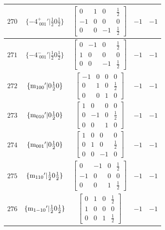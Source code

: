 \documentclass[fleqn,8pt]{jsarticle}
\begin{document}
\begin{longtable}{ccccc}
$ 270 $ & $ \{-4^{+}_{\,\,001}{}'|\frac{1}{2} 0 \frac{1}{2}\} $ & $ \begin{bmatrix} 0 & 1 & 0 & \frac{1}{2} \\ -1 & 0 & 0 & 0 \\ 0 & 0 & -1 & \frac{1}{2} \end{bmatrix} $ & $ -1 $ & $ -1 $ \\ \hline
$ 271 $ & $ \{-4^{-}_{\,\,001}{}'|\frac{1}{2} 0 \frac{1}{2}\} $ & $ \begin{bmatrix} 0 & -1 & 0 & \frac{1}{2} \\ 1 & 0 & 0 & 0 \\ 0 & 0 & -1 & \frac{1}{2} \end{bmatrix} $ & $ -1 $ & $ -1 $ \\ \hline
$ 272 $ & $ \{{\rm m}_{100}{}'|0 \frac{1}{2} 0\} $ & $ \begin{bmatrix} -1 & 0 & 0 & 0 \\ 0 & 1 & 0 & \frac{1}{2} \\ 0 & 0 & 1 & 0 \end{bmatrix} $ & $ -1 $ & $ -1 $ \\ \hline
$ 273 $ & $ \{{\rm m}_{010}{}'|0 \frac{1}{2} 0\} $ & $ \begin{bmatrix} 1 & 0 & 0 & 0 \\ 0 & -1 & 0 & \frac{1}{2} \\ 0 & 0 & 1 & 0 \end{bmatrix} $ & $ -1 $ & $ -1 $ \\ \hline
$ 274 $ & $ \{{\rm m}_{001}{}'|0 \frac{1}{2} 0\} $ & $ \begin{bmatrix} 1 & 0 & 0 & 0 \\ 0 & 1 & 0 & \frac{1}{2} \\ 0 & 0 & -1 & 0 \end{bmatrix} $ & $ -1 $ & $ -1 $ \\ \hline
$ 275 $ & $ \{{\rm m}_{110}{}'|\frac{1}{2} 0 \frac{1}{2}\} $ & $ \begin{bmatrix} 0 & -1 & 0 & \frac{1}{2} \\ -1 & 0 & 0 & 0 \\ 0 & 0 & 1 & \frac{1}{2} \end{bmatrix} $ & $ -1 $ & $ -1 $ \\ \hline
$ 276 $ & $ \{{\rm m}_{1-10}{}'|\frac{1}{2} 0 \frac{1}{2}\} $ & $ \begin{bmatrix} 0 & 1 & 0 & \frac{1}{2} \\ 1 & 0 & 0 & 0 \\ 0 & 0 & 1 & \frac{1}{2} \end{bmatrix} $ & $ -1 $ & $ -1 $ \\ \hline

\end{longtable}
\end{document}
